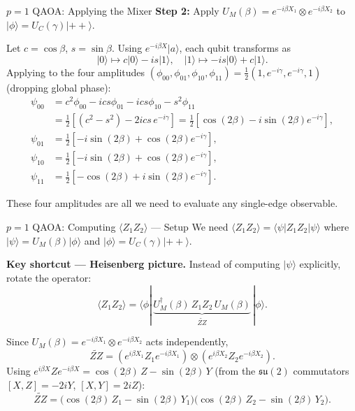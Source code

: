 \documentclass{beamer}
\begin{document}

\begin{frame}{$p=1$ QAOA: Applying the Mixer}
\textbf{Step 2:} Apply $U_M(\beta) = e^{-i\beta X_1}\otimes e^{-i\beta X_2}$
to $|\phi\rangle = U_C(\gamma)|{++}\rangle$.

Let $c=\cos\beta$, $s=\sin\beta$.  Using
$e^{-i\beta X}|a\rangle$, each qubit transforms as
\[
|0\rangle\mapsto c|0\rangle-is|1\rangle,\quad
|1\rangle\mapsto -is|0\rangle+c|1\rangle.
\]
Applying to the four amplitudes $(\phi_{00},\phi_{01},\phi_{10},\phi_{11})
= \tfrac{1}{2}(1,e^{-i\gamma},e^{-i\gamma},1)$ (dropping global phase):
\begin{align*}
\psi_{00} &= c^2\phi_{00} - ics\phi_{01} - ics\phi_{10} - s^2\phi_{11}\\
          &= \tfrac{1}{2}[(c^2-s^2) - 2ics\,e^{-i\gamma}]
           = \tfrac{1}{2}[\cos(2\beta) - i\sin(2\beta)e^{-i\gamma}],\\
\psi_{01} &= \tfrac{1}{2}[-i\sin(2\beta) + \cos(2\beta)e^{-i\gamma}],\\
\psi_{10} &= \tfrac{1}{2}[-i\sin(2\beta) + \cos(2\beta)e^{-i\gamma}],\\
\psi_{11} &= \tfrac{1}{2}[-\cos(2\beta) + i\sin(2\beta)e^{-i\gamma}].
\end{align*}

These four amplitudes are all we need to evaluate any single-edge observable.
\end{frame}


\begin{frame}{$p=1$ QAOA: Computing $\langle Z_1Z_2\rangle$ — Setup}
We need $\langle Z_1Z_2\rangle
= \langle\psi|Z_1Z_2|\psi\rangle$ where
$|\psi\rangle = U_M(\beta)|\phi\rangle$ and $|\phi\rangle = U_C(\gamma)|{++}\rangle$.

\medskip
\textbf{Key shortcut — Heisenberg picture.}  Instead of computing $|\psi\rangle$ explicitly,
rotate the operator:
\[
\langle Z_1Z_2\rangle
= \langle\phi|\,\underbrace{U_M^\dagger(\beta)\,Z_1Z_2\,U_M(\beta)}_{\widetilde{ZZ}}\,|\phi\rangle.
\]

Since $U_M(\beta)=e^{-i\beta X_1}\otimes e^{-i\beta X_2}$ acts independently,
\[
\widetilde{ZZ}
= (e^{i\beta X_1}Z_1 e^{-i\beta X_1})\otimes(e^{i\beta X_2}Z_2 e^{-i\beta X_2}).
\]
Using $e^{i\beta X}Ze^{-i\beta X} = \cos(2\beta)\,Z - \sin(2\beta)\,Y$
(from the $\mathfrak{su}(2)$ commutators $[X,Z]=-2iY$, $[X,Y]=2iZ$):
\[
\widetilde{ZZ}
= \bigl(\cos(2\beta)\,Z_1 - \sin(2\beta)\,Y_1\bigr)
  \bigl(\cos(2\beta)\,Z_2 - \sin(2\beta)\,Y_2\bigr).
\]
\end{frame}
\end{document}
